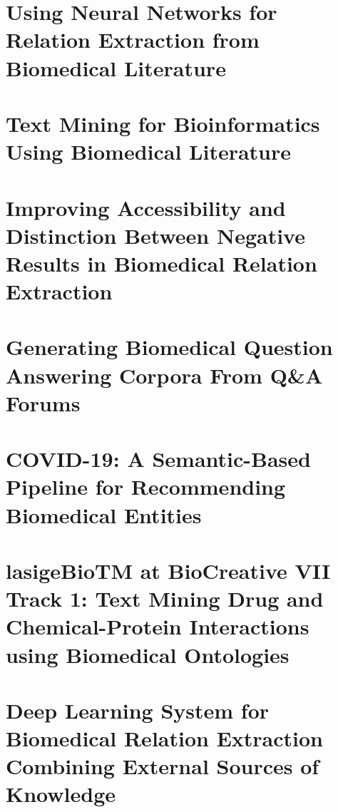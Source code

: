 \hypertarget{a}{\appendix}

\hypertarget{AA}{\chapter{Using Neural Networks for Relation Extraction from Biomedical Literature}}


\hypertarget{AB}{\chapter{Text Mining for Bioinformatics Using Biomedical Literature}}


\hypertarget{AC}{\chapter{Improving Accessibility and Distinction Between Negative Results in Biomedical Relation Extraction}}


\hypertarget{AD}{\chapter{Generating Biomedical Question Answering Corpora From Q\&A Forums}}


\hypertarget{AE}{\chapter{COVID-19: A Semantic-Based Pipeline for Recommending Biomedical Entities}}


\hypertarget{AF}{\chapter{lasigeBioTM at BioCreative VII Track 1: Text Mining Drug and Chemical-Protein Interactions using Biomedical Ontologies}}


\hypertarget{AG}{\chapter{Deep Learning System for Biomedical Relation Extraction Combining External Sources of Knowledge}}


